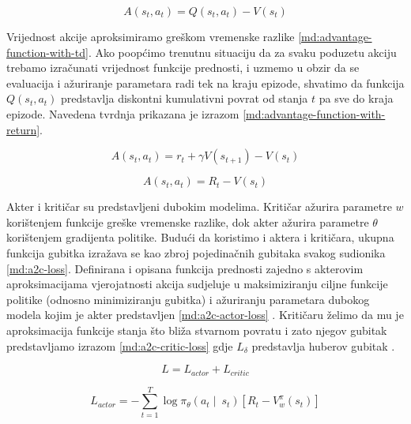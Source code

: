 \begin{equation}
    \label{md:advantage-function}
    A (s_t, a_t) = Q (s_t, a_t) - V (s_t) 
\end{equation}

\bigskip

Vrijednost akcije aproksimiramo greškom vremenske razlike \ref{md:advantage-function-with-td}. Ako poopćimo trenutnu situaciju da za svaku poduzetu akciju trebamo izračunati vrijednost funkcije prednosti, i uzmemo u obzir da se evaluacija i ažuriranje parametara radi tek na kraju epizode, shvatimo da funkcija $Q (s_t, a_t)$ predstavlja diskontni kumulativni povrat od stanja $t$ pa sve do kraja epizode. Navedena tvrdnja prikazana je izrazom \ref{md:advantage-function-with-return}.

\begin{equation}
    \label{md:advantage-function-with-td}
    A (s_t, a_t) = r_t + \gamma V(s_{t+1}) - V (s_t) 
\end{equation}

\begin{equation}
    \label{md:advantage-function-with-return}
    A (s_t, a_t) = R_t - V (s_t) 
\end{equation}

\bigskip

Akter i kritičar su predstavljeni dubokim modelima. Kritičar ažurira parametre $w$ korištenjem funkcije greške vremenske razlike, dok akter ažurira parametre $\theta$ korištenjem gradijenta politike. Budući da koristimo i aktera i kritičara, ukupna funkcija gubitka izražava se kao zbroj pojedinačnih gubitaka svakog sudionika \ref{md:a2c-loss}. Definirana i opisana funkcija prednosti zajedno s akterovim aproksimacijama vjerojatnosti akcija sudjeluje u maksimiziranju ciljne funkcije politike (odnosno minimiziranju gubitka) i ažuriranju parametara dubokog modela kojim je akter predstavljen \ref{md:a2c-actor-loss} \cite{A2C-tensorflow}. Kritičaru želimo da mu je aproksimacija funkcije stanja što bliža stvarnom povratu i zato njegov gubitak predstavljamo izrazom \ref{md:a2c-critic-loss} gdje $L_\delta$ predstavlja huberov gubitak  \cite{A2C-tensorflow}.

\begin{equation}
    \label{md:a2c-loss}
    L = L_{actor} + L_{critic}
\end{equation}

\begin{equation}
    \label{md:a2c-actor-loss}
    L_{actor} = - \sum_{t=1}^{T}\log \pi_\theta (a_t \mid \ s_t) \left[ R_t - V_{w}^{\pi} (s_t) \right]
\end{equation}

